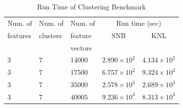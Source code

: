 \begin{table}
  \caption{Run Time of Clustering Benchmark}
  \label{tab:clusterResults}
  \begin{tabular}{lllcc}
    \toprule
    Num. of   & Num. of   & Num. of & \multicolumn{2}{c}{Run time (sec)}\\
    features  & clusters  & feature           & SNB & KNL\\
              &           & vectors           & &\\
    \midrule
    $3$ & $7$ & $14000$ & $2.890\times 10^{2}$ & $4.134\times 10^{2}$ \\ %
    $3$ & $7$ & $17500$ & $6.757\times 10^{2}$ & $9.324\times 10^{2}$ \\ %
    $3$ & $7$ & $35000$ & $2.578\times 10^{3}$ & $2.689\times 10^{3}$ \\ %
    $3$ & $7$ & $40005$ & $9.236\times 10^{3}$ & $8.313\times 10^{3}$ \\ %
    \bottomrule
  \end{tabular}
\end{table}

